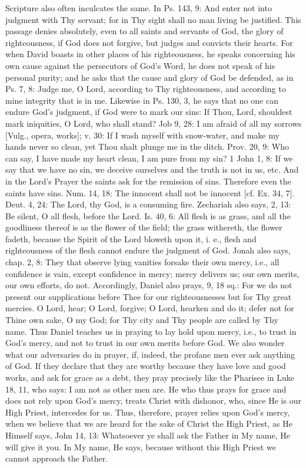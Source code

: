 Scripture also often inculcates the same.  In Ps. 143, 9: And enter
not into judgment with Thy servant; for in Thy sight shall no man
living be justified.  This passage denies absolutely, even to all
saints and servants of God, the glory of righteousness, if God does
not forgive, but judges and convicts their hearts.  For when David
boasts in other places of his righteousness, he speaks concerning his
own cause against the persecutors of God's Word, he does not speak of
his personal purity; and he asks that the cause and glory of God be
defended, as in Ps. 7, 8: Judge me, O Lord, according to Thy
righteousness, and according to mine integrity that is in me.
Likewise in Ps. 130, 3, he says that no one can endure God's judgment,
if God were to mark our sins: If Thou, Lord, shouldest mark
iniquities, O Lord, who shall stand?  Job 9, 28: I am afraid of all
my sorrows [Vulg., opera, works]; v. 30: If I wash myself with
snow-water, and make my hands never so clean, yet Thou shalt plunge
me in the ditch.  Prov. 20, 9: Who can say, I have made my heart
clean, I am pure from my sin? 1 John 1, 8: If we say that we have no
sin, we deceive ourselves and the truth is not in us, etc. And in the
Lord's Prayer the saints ask for the remission of sins.  Therefore
even the saints have sins.  Num. 14, 18: The innocent shall not be
innocent [cf.  Ex. 34, 7].  Deut. 4, 24: The Lord, thy God, is a
consuming fire.  Zechariah also says, 2, 13: Be silent, O all flesh,
before the Lord.  Is. 40, 6: All flesh is as grass, and all the
goodliness thereof is as the flower of the field; the grass withereth,
the flower fadeth, because the Spirit of the Lord bloweth upon it, i.
e., flesh and righteousness of the flesh cannot endure the judgment
of God.  Jonah also says, chap. 2, 8: They that observe lying
vanities forsake their own mercy, i.e., all confidence is vain,
except confidence in mercy; mercy delivers us; our own merits, our
own efforts, do not.  Accordingly, Daniel also prays, 9, 18 sq.: For
we do not present our supplications before Thee for our
righteousnesses but for Thy great mercies.  O Lord, hear; O Lord,
forgive; O Lord, hearken and do it; defer not for Thine own sake, O
my God; for Thy city and Thy people are called by Thy name.  Thus
Daniel teaches us in praying to lay hold upon mercy, i.e., to trust
in God's mercy, and not to trust in our own merits before God.  We
also wonder what our adversaries do in prayer, if, indeed, the
profane men ever ask anything of God.  If they declare that they are
worthy because they have love and good works, and ask for grace as a
debt, they pray precisely like the Pharisee in Luke 18, 11, who says:
I am not as other men are.  He who thus prays for grace and does not
rely upon God's mercy, treats Christ with dishonor, who, since He is
our High Priest, intercedes for us.  Thus, therefore, prayer relies
upon God's mercy, when we believe that we are heard for the sake of
Christ the High Priest, as He Himself says, John 14, 13: Whatsoever
ye shall ask the Father in My name, He will give it you.  In My name,
He says, because without this High Priest we cannot approach the
Father.

